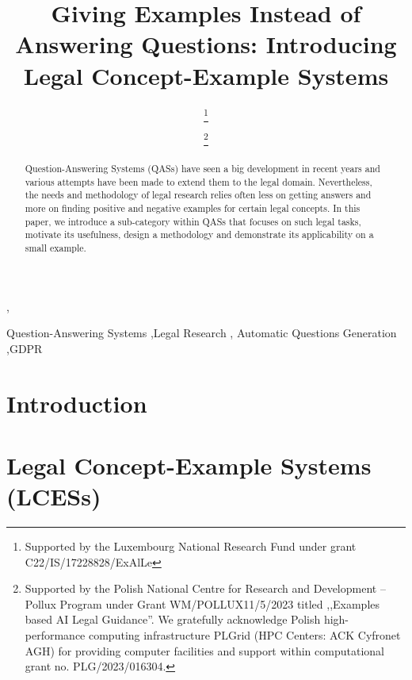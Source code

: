 \documentclass{IOS-Book-Article}
\theoremstyle{definition}
\begin{document}
\begin{frontmatter}              %

\title{Giving Examples Instead of Answering Questions: Introducing Legal Concept-Example Systems}

\author[A]{ 
\thanks{Supported by the Luxembourg National Research Fund under grant C22/IS/17228828/ExAlLe}},
\author[B]{ 
\thanks{Supported by the Polish National Centre for Research
and Development – Pollux Program under Grant WM/POLLUX11/5/2023
titled ,,Examples based AI Legal Guidance''. We gratefully acknowledge Polish high-performance computing infrastructure PLGrid
(HPC Centers: ACK Cyfronet AGH) for providing computer facilities and support within computational grant no. PLG/2023/016304.}}

\address[A]{Department of Computer Science, Luxembourg University, Luxembourg}
\address[B]{Computer Science Institute, AGH University of Krakow, Poland}

\begin{abstract}
Question-Answering Systems (QASs) have seen a big development in recent years and various attempts have been made to extend them to the legal domain. Nevertheless, the needs and methodology of legal research relies often less on getting answers and more on finding positive and negative examples for certain legal concepts. In this paper, we introduce a sub-category within QASs that focuses on such legal tasks, motivate its usefulness, design a methodology and demonstrate its applicability on a small example.
\end{abstract}

\begin{keyword}
Question-Answering Systems \sep Legal Research \sep
Automatic Questions Generation \sep GDPR
\end{keyword}
\end{frontmatter}

\thispagestyle{empty}
\pagestyle{empty}

\section{Introduction}



\section{Legal Concept-Example Systems (LCESs)}
\label{sec:lces}
\end{document}
